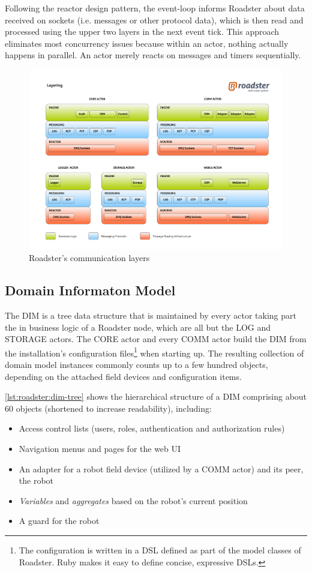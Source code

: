 Following the reactor design pattern, the event-loop informs Roadster about
data received on sockets (i.e. \zmq messages or other protocol data), which is
then read and processed using the upper two layers in the next event
tick. This approach eliminates most concurrency issues because within an actor,
nothing actually happens in parallel. An actor merely reacts on messages and
timers sequentially.

\begin{figure}[]
	\includegraphics[trim=1.95cm 2.5cm 1.65cm 2.8cm, clip=true, width=\textwidth]{img/roadster_layering.pdf}
	\caption{Roadster's communication layers}
	\label{fig:roadster:layers}
\end{figure}


\subsection{Domain Informaton Model}
The \acrfull{DIM} is a tree data structure that is maintained by every actor
taking part the in business logic of a Roadster node, which are all but the LOG
and STORAGE actors.  The CORE actor and every COMM actor build the DIM from the
installation's configuration files\footnote{The configuration is written in a
\gls{DSL} defined as part of the model classes of Roadster. Ruby makes it easy
to define concise, expressive DSLs.} when starting up. The resulting collection
of domain model instances commonly counts up to a few hundred objects,
depending on the attached field devices and configuration items.


\autoref{lst:roadster:dim-tree} shows the hierarchical structure of a
DIM comprising about 60 objects (shortened to increase readability), including:
\begin{itemize}
	\item Access control lists (users, roles, authentication and authorization rules)
	\item Navigation menus and pages for the web UI
	\item An adapter for a robot field device (utilized by a COMM actor) and its peer, the robot
	\item \emph{Variables} and \emph{aggregates} based on the robot's current position
	\item A guard for the robot
\end{itemize}

